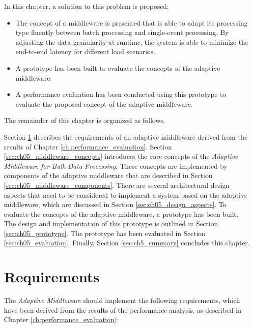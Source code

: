In this chapter, a solution to this problem is proposed:

\begin{itemize}
	\item The concept of a middleware is presented that is able to adapt its processing type fluently between batch processing and single-event processing. By adjusting the data granularity at runtime, the system is able to minimize the end-to-end latency for different load scenarios.
	\item A prototype has been built to evaluate the concepts of the adaptive middleware.
	\item A performance evaluation has been conducted using this prototype to evaluate the proposed concept of the adaptive middleware.
\end{itemize}

The remainder of this chapter is organized as follows. 

Section \ref{sec:ch04_requirements} describes the requirements of an adaptive middleware derived from the results of Chapter \ref{ch:performance_evaluation}. Section \ref{sec:ch05_middleware_concepts} introduces the core concepts of the \emph{Adaptive Middleware for Bulk Data Processing}. These concepts are implemented by components of the adaptive middleware that are described in Section \ref{sec:ch05_middleware_components}. There are several architectural design aspects that need to be considered to implement a system based on the adaptive middleware, which are discussed in Section \ref{sec:ch05_design_aspects}. To evaluate the concepts of the adaptive middleware, a prototype has been built. The design and implementation of this prototype is outlined in Section \ref{sec:ch05_prototype}. The prototype has been evaluated in Section \ref{sec:ch05_evaluation}. Finally, Section \ref{sec:ch5_summary} concludes this chapter.

\section{Requirements}
\label{sec:ch04_requirements}

The \emph{Adaptive Middleware} should implement the following requirements, which have been derived from the results of the performance analysis, as described in Chapter \ref{ch:performance_evaluation}:

